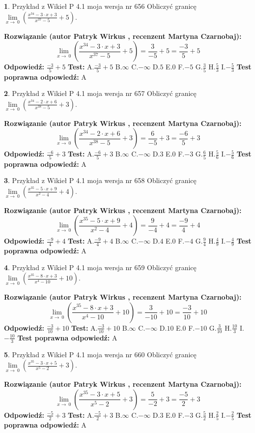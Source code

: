 \documentclass[12pt, a4paper]{article}
\theoremstyle{definition} %
\newtheorem{zad}{}
\newcommand{\zadStart}[1]{\begin{zad}#1\newline}
\newcommand{\zadStop}{\end{zad}}
\newcommand{\rozwStart}[2]{\noindent \textbf{Rozwiązanie (autor #1 , recenzent #2): }\newline}
\newcommand{\rozwStop}{\newline}
\newcommand{\odpStart}{\noindent \textbf{Odpowiedź:}\newline}
\newcommand{\odpStop}{\newline}
\newcommand{\testStart}{\noindent \textbf{Test:}\newline}
\newcommand{\testStop}{\newline}
\newcommand{\kluczStart}{\noindent \textbf{Test poprawna odpowiedź:}\newline}
\newcommand{\kluczStop}{\newline}
\begin{document}
\zadStart{Przykład z Wikieł P 4.1 moja wersja nr 656}
Obliczyć granicę $\lim\limits_{x\to\ 0}(\frac{x^{34}-3 \cdot x +3}{x^{37}-5}+5)$.
\zadStop
\rozwStart{Patryk Wirkus}{Martyna Czarnobaj}
$$\lim\limits_{x\to\ 0}(\frac{x^{34}-3 \cdot x +3}{x^{37}-5}+5)=\frac{3}{-5}+5=\frac{-3}{5}+5$$
\rozwStop
\odpStart
$\frac{-3}{5}+5$
\odpStop
\testStart
A.$\frac{-3}{5}+5$
B.$\infty$
C.$-\infty$
D.$5$
E.$0$
F.$-5$
G.$\frac{3}{5}$
H.$\frac{5}{3}$
I.$-\frac{5}{3}$
\testStop
\kluczStart
A
\kluczStop



\zadStart{Przykład z Wikieł P 4.1 moja wersja nr 657}
Obliczyć granicę $\lim\limits_{x\to\ 0}(\frac{x^{34}-2 \cdot x +6}{x^{38}-5}+3)$.
\zadStop
\rozwStart{Patryk Wirkus}{Martyna Czarnobaj}
$$\lim\limits_{x\to\ 0}(\frac{x^{34}-2 \cdot x +6}{x^{38}-5}+3)=\frac{6}{-5}+3=\frac{-6}{5}+3$$
\rozwStop
\odpStart
$\frac{-6}{5}+3$
\odpStop
\testStart
A.$\frac{-6}{5}+3$
B.$\infty$
C.$-\infty$
D.$3$
E.$0$
F.$-3$
G.$\frac{6}{5}$
H.$\frac{5}{6}$
I.$-\frac{5}{6}$
\testStop
\kluczStart
A
\kluczStop



\zadStart{Przykład z Wikieł P 4.1 moja wersja nr 658}
Obliczyć granicę $\lim\limits_{x\to\ 0}(\frac{x^{35}-5 \cdot x +9}{x^{2}-4}+4)$.
\zadStop
\rozwStart{Patryk Wirkus}{Martyna Czarnobaj}
$$\lim\limits_{x\to\ 0}(\frac{x^{35}-5 \cdot x +9}{x^{2}-4}+4)=\frac{9}{-4}+4=\frac{-9}{4}+4$$
\rozwStop
\odpStart
$\frac{-9}{4}+4$
\odpStop
\testStart
A.$\frac{-9}{4}+4$
B.$\infty$
C.$-\infty$
D.$4$
E.$0$
F.$-4$
G.$\frac{9}{4}$
H.$\frac{4}{9}$
I.$-\frac{4}{9}$
\testStop
\kluczStart
A
\kluczStop



\zadStart{Przykład z Wikieł P 4.1 moja wersja nr 659}
Obliczyć granicę $\lim\limits_{x\to\ 0}(\frac{x^{35}-8 \cdot x +3}{x^{4}-10}+10)$.
\zadStop
\rozwStart{Patryk Wirkus}{Martyna Czarnobaj}
$$\lim\limits_{x\to\ 0}(\frac{x^{35}-8 \cdot x +3}{x^{4}-10}+10)=\frac{3}{-10}+10=\frac{-3}{10}+10$$
\rozwStop
\odpStart
$\frac{-3}{10}+10$
\odpStop
\testStart
A.$\frac{-3}{10}+10$
B.$\infty$
C.$-\infty$
D.$10$
E.$0$
F.$-10$
G.$\frac{3}{10}$
H.$\frac{10}{3}$
I.$-\frac{10}{3}$
\testStop
\kluczStart
A
\kluczStop



\zadStart{Przykład z Wikieł P 4.1 moja wersja nr 660}
Obliczyć granicę $\lim\limits_{x\to\ 0}(\frac{x^{35}-3 \cdot x +5}{x^{5}-2}+3)$.
\zadStop
\rozwStart{Patryk Wirkus}{Martyna Czarnobaj}
$$\lim\limits_{x\to\ 0}(\frac{x^{35}-3 \cdot x +5}{x^{5}-2}+3)=\frac{5}{-2}+3=\frac{-5}{2}+3$$
\rozwStop
\odpStart
$\frac{-5}{2}+3$
\odpStop
\testStart
A.$\frac{-5}{2}+3$
B.$\infty$
C.$-\infty$
D.$3$
E.$0$
F.$-3$
G.$\frac{5}{2}$
H.$\frac{2}{5}$
I.$-\frac{2}{5}$
\testStop
\kluczStart
A
\kluczStop
\end{document}

